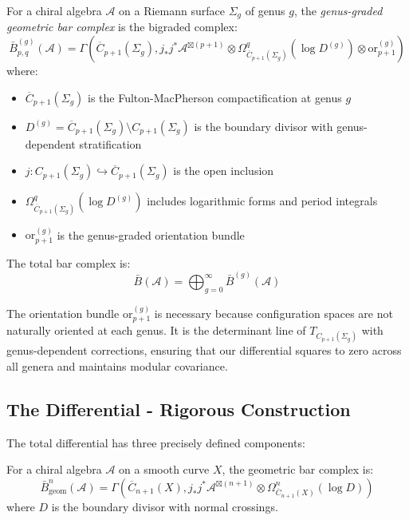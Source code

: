 \begin{definition}\label{def:geom-bar}
For a chiral algebra $\mathcal{A}$ on a Riemann surface $\Sigma_g$ of genus $g$, the \emph{genus-graded geometric bar complex} is the bigraded complex:
\[
\bar{B}^{(g)}_{p,q}(\mathcal{A}) = \Gamma\left(\overline{C}_{p+1}(\Sigma_g), j_*j^*\mathcal{A}^{\boxtimes(p+1)} \otimes \Omega^q_{\overline{C}_{p+1}(\Sigma_g)}(\log D^{(g)}) \otimes \text{or}_{p+1}^{(g)}\right)
\]
where:
\begin{itemize}
\item $\overline{C}_{p+1}(\Sigma_g)$ is the Fulton-MacPherson compactification at genus $g$
\item $D^{(g)} = \overline{C}_{p+1}(\Sigma_g) \setminus C_{p+1}(\Sigma_g)$ is the boundary divisor with genus-dependent stratification
\item $j: C_{p+1}(\Sigma_g) \hookrightarrow \overline{C}_{p+1}(\Sigma_g)$ is the open inclusion
\item $\Omega^q_{\overline{C}_{p+1}(\Sigma_g)}(\log D^{(g)})$ includes logarithmic forms and period integrals
\item $\text{or}_{p+1}^{(g)}$ is the genus-graded orientation bundle
\end{itemize}

The total bar complex is:
$$\bar{B}(\mathcal{A}) = \bigoplus_{g=0}^{\infty} \bar{B}^{(g)}(\mathcal{A})$$
\end{definition}
 
\begin{remark}
The orientation bundle $\text{or}_{p+1}^{(g)}$ is necessary because configuration spaces are not naturally 
oriented at each genus. It is the determinant line of $T_{C_{p+1}(\Sigma_g)}$ with genus-dependent corrections, ensuring that our differential squares to zero across all genera and maintains modular covariance.
\end{remark}
 
\subsection{The Differential - Rigorous Construction}
 
The total differential has three precisely defined components:
 
\begin{definition}\label{def:geometric-bar}
For a chiral algebra $\mathcal{A}$ on a smooth curve $X$, the geometric bar complex is:
$$\bar{B}_{\text{geom}}^n(\mathcal{A}) = \Gamma\left(\overline{C}_{n+1}(X), j_*j^*\mathcal{A}^{\boxtimes(n+1)} \otimes \Omega^n_{\overline{C}_{n+1}(X)}(\log D)\right)$$
where $D$ is the boundary divisor with normal crossings.
\end{definition}

